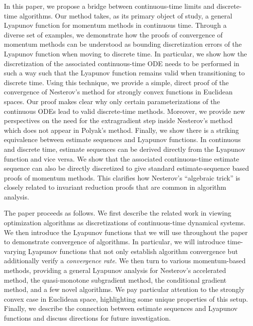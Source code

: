 \documentclass[11pt]{article}
\theoremstyle{plain}
\begin{document}
In this paper, we propose a bridge between continuous-time limits and discrete-time algorithms.  Our method takes, as its primary object of study, a general Lyapunov function for momentum methods in continuous time.  Through a diverse set of examples, we demonstrate how the proofs of convergence of momentum methods can be understood as bounding discretization errors of the Lyapunov function when moving to discrete time.  In particular, we show how the discretization of the associated continuous-time ODE needs to be performed in such a way such that the Lyapunov function remains valid when transitioning to discrete time.
Using this technique, we provide a simple, direct proof of the convergence of Nesterov's method for strongly convex functions in Euclidean spaces.  Our proof makes clear why only certain parameterizations of the continuous ODEs lead to valid discrete-time methods.  Moreover, we provide new perspectives on the need for the extragradient step inside Nesterov's method which does not appear in Polyak's method.  
Finally, we show there is a striking equivalence between estimate sequences and Lyapunov functions.  In continuous and discrete time, estimate sequences can be derived directly from the Lyapunov function and vice versa.  We show that the associated continuous-time estimate sequence can also be directly discretized to give standard estimate-sequence based proofs of momentum methods.  This clarifies how Nesterov's ``algebraic trick'' is closely related to invariant reduction proofs that are common in algorithm analysis.

The paper proceeds as follows.  We first describe the related work in viewing optimization algorithms as discretizations of continuous-time dynamical systems.  We then introduce the Lyapunov functions that we will use throughout the paper to demonstrate convergence of algorithms.  In particular, we will introduce time-varying Lyapunov functions that not only establish algorithm convergence but additionally verify a \emph{convergence rate}.  
 We then turn to various momentum-based methods, providing a general Lyapunov analysis for Nesterov's accelerated method, the quasi-monotone subgradient method, the conditional gradient method, and a few novel algorithms.  We pay particular attention to the strongly convex case in Euclidean space, highlighting some unique properties of this setup.  Finally, we describe the connection between estimate sequences and Lyapunov functions and discuss directions for future investigation.
 
\end{document}
